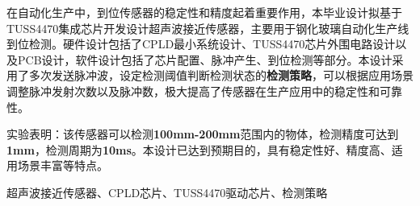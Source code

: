 \begin{ZhAbstract}
    在自动化生产中，到位传感器的稳定性和精度起着重要作用，本毕业设计拟基于TUSS4470集成芯片开发设计超声波接近传感器，主要用于钢化玻璃自动化生产线到位检测。硬件设计包括了CPLD最小系统设计、TUSS4470芯片外围电路设计以及PCB设计，软件设计包括了芯片配置、脉冲产生、到位检测等部分。本设计采用了多次发送脉冲波，设定检测阈值判断检测状态的\textbf{检测策略}，可以根据应用场景调整脉冲发射次数以及脉冲数，极大提高了传感器在生产应用中的稳定性和可靠性。\par
    实验表明：该传感器可以检测\textbf{100mm-200mm}范围内的物体，检测精度可达到\textbf{1mm}，检测周期为\textbf{10ms}。本设计已达到预期目的，具有稳定性好、精度高、适用场景丰富等特点。
  
  
    \ChineseKeyWord 超声波接近传感器、CPLD芯片、TUSS4470驱动芯片、检测策略
    
\end{ZhAbstract}